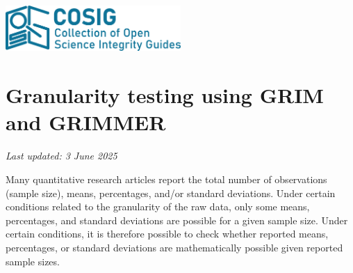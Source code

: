 \documentclass[letterpaper, 12pt]{article}
\begin{document}
\flushleft
\includegraphics[width=0.5\textwidth]{img/home/241017_final_logo_mockup.png}

\section*{Granularity testing using GRIM and GRIMMER}
\textit{Last updated: 3 June 2025}

Many quantitative research articles report the total number of observations (sample size), means, percentages, and/or standard deviations. Under certain conditions related to the granularity of the raw data, only some means, percentages, and standard deviations are possible for a given sample size. Under certain conditions, it is therefore possible to check whether reported means, percentages, or standard deviations are mathematically possible given reported sample sizes. 
\end{document}
